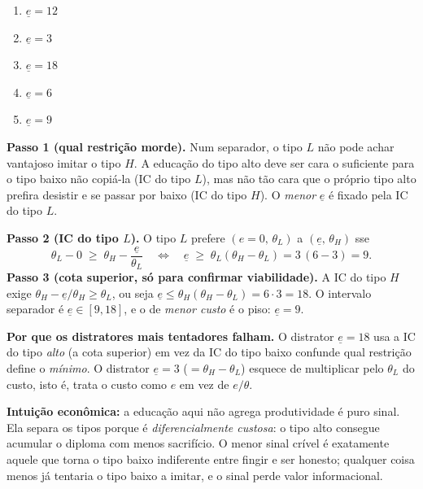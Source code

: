 \begin{enumerate}[label=\Alph*., leftmargin=3.2em, itemsep=0.15em, topsep=0.2em]
  \item $\underline{e} = 12$
  \item $\underline{e} = 3$
  \item $\underline{e} = 18$
  \item $\underline{e} = 6$
  \item $\underline{e} = 9$
\end{enumerate}
\begin{solucao}
\textbf{Passo 1 (qual restri\c{c}\~ao morde).} Num separador, o tipo $L$ n\~ao pode achar vantajoso imitar o tipo $H$. A educa\c{c}\~ao do tipo alto deve ser cara o suficiente para o tipo baixo n\~ao copi\'a-la (IC do tipo $L$), mas n\~ao t\~ao cara que o pr\'oprio tipo alto prefira desistir e se passar por baixo (IC do tipo $H$). O \emph{menor} $\underline{e}$ \'e fixado pela IC do tipo $L$.

\textbf{Passo 2 (IC do tipo $L$).} O tipo $L$ prefere $(e=0,\,\theta_L)$ a $(\underline{e},\,\theta_H)$ sse
\[
\theta_L - 0 \;\ge\; \theta_H - \frac{\underline{e}}{\theta_L}
\quad\Longleftrightarrow\quad
\underline{e} \;\ge\; \theta_L(\theta_H - \theta_L) = 3\,(6-3) = 9.
\]
\textbf{Passo 3 (cota superior, s\'o para confirmar viabilidade).} A IC do tipo $H$ exige $\theta_H - \underline{e}/\theta_H \ge \theta_L$, ou seja $\underline{e} \le \theta_H(\theta_H-\theta_L) = 6\cdot 3 = 18$. O intervalo separador \'e $\underline{e}\in[9,18]$, e o de \emph{menor custo} \'e o piso: $\underline{e}=9$.

\textbf{Por que os distratores mais tentadores falham.} O distrator $\underline{e}=18$ usa a IC do tipo \emph{alto} (a cota superior) em vez da IC do tipo baixo \textemdash{} confunde qual restri\c{c}\~ao define o \emph{m\'inimo}. O distrator $\underline{e}=3$ ($=\theta_H-\theta_L$) esquece de multiplicar pelo $\theta_L$ do custo, isto \'e, trata o custo como $e$ em vez de $e/\theta$.

\textbf{Intui\c{c}\~ao econ\^omica:} a educa\c{c}\~ao aqui n\~ao agrega produtividade \textemdash{} \'e puro sinal. Ela separa os tipos porque \'e \emph{diferencialmente custosa}: o tipo alto consegue acumular o diploma com menos sacrif\'icio. O menor sinal cr\'ivel \'e exatamente aquele que torna o tipo baixo indiferente entre fingir e ser honesto; qualquer coisa menos j\'a tentaria o tipo baixo a imitar, e o sinal perde valor informacional.
\end{solucao}

